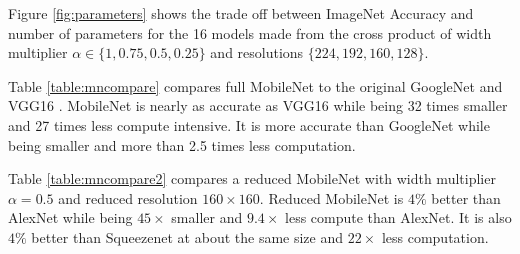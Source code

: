 \documentclass[10pt,twocolumn,letterpaper]{article}
\begin{document}
Figure \ref{fig:parameters} shows the trade off between ImageNet Accuracy and number of parameters for the 16 models made from the cross product of width multiplier $\alpha \in \{1,0.75,0.5,0.25\}$ and resolutions $\{224, 192, 160, 128\}$. %

Table \ref{table:mncompare} compares full MobileNet to the original GoogleNet \cite{szegedy2015going} and VGG16 \cite{simonyan2014very}. MobileNet is nearly as accurate as VGG16 while being 32 times smaller and 27 times less compute intensive. It is more accurate than GoogleNet while being smaller and more than 2.5 times less computation.

Table \ref{table:mncompare2} compares a reduced MobileNet with width multiplier $\alpha=0.5$ and reduced resolution $160\times160$. Reduced MobileNet is $4\%$ better than AlexNet \cite{krizhevsky2012imagenet} while being $45\times$ smaller and $9.4\times$ less compute than AlexNet. It is also $4\%$ better than Squeezenet \cite{iandola2016squeezenet} at about the same size and $22 \times$ less computation.

\begin{table}[t]
  \caption{MobileNet Comparison to Popular Models} %
\centering %
\end{table}
\end{document}
